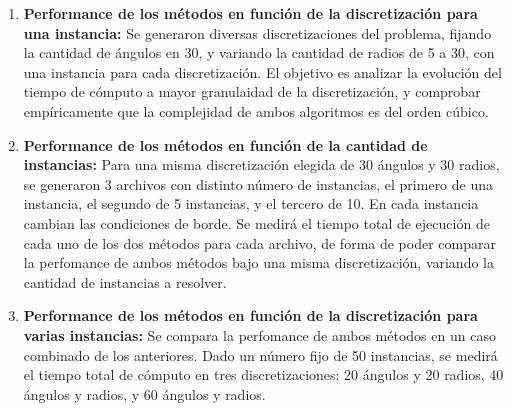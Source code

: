 \begin{enumerate}

\item \textbf {Performance de los m\'etodos en funci\'on de la discretizaci\'on para una instancia:}  Se generaron diversas discretizaciones del problema, fijando la cantidad de \'angulos en 30, y variando la cantidad de radios de 5 a 30, con una instancia para cada discretizaci\'on. El objetivo es analizar la evoluci\'on del tiempo de c\'omputo a mayor granulaidad de la discretizaci\'on, y comprobar emp\'iricamente que la complejidad de ambos algoritmos es del orden c\'ubico.
\item \textbf {Performance de los m\'etodos en funci\'on de la cantidad de instancias:} Para una misma discretizaci\'on elegida de 30 \'angulos y 30 radios, se generaron 3 archivos con distinto n\'umero de instancias, el primero de una instancia, el segundo de 5 instancias, y el tercero de 10. En cada instancia cambian las condiciones de borde. Se medir\'a el tiempo total de ejecuci\'on de cada uno de los dos m\'etodos para cada archivo, de forma de poder comparar la perfomance de ambos m\'etodos bajo una misma discretizaci\'on, variando la cantidad de instancias a resolver.
\item \textbf {Performance de los m\'etodos en funci\'on de la discretizaci\'on para varias instancias:}
Se compara la perfomance de ambos m\'etodos en un caso combinado de los anteriores. Dado un n\'umero fijo de 50 instancias, se medir\'a el tiempo total de c\'omputo en tres discretizaciones: 20 \'angulos y 20 radios, 40 \'angulos y radios, y 60 \'angulos y radios. 
\end{enumerate}

